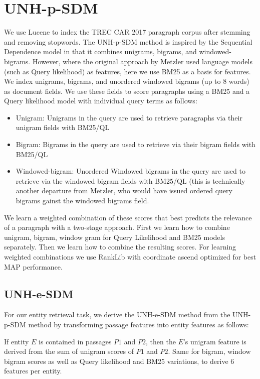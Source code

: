 \documentclass{article}
\begin{document}
\section{UNH-p-SDM}\label{sec:sdm}

We use Lucene to index the TREC CAR 2017 paragraph corpus after stemming and removing stopwords.
The UNH-p-SDM method is inspired by the Sequential Dependence model \cite{metzler2005markov} in that it combines unigrams, bigrams, and windowed-bigrams. However, where the original approach by Metzler used language models (such as Query likelihood) as features, here we use BM25 as a basis for features. 
 We index unigrams, bigrams, and unordered windowed bigrams (up to 8 words) as document fields. We use these fields to score paragraphs using a BM25 and a Query likelihood model with individual query terms as follows:
 
 \begin{itemize}
     \item Unigram: Unigrams in the query are used to retrieve paragraphs via their unigram fields with BM25/QL
     \item Bigram: Bigrams in the query are used to retrieve via their bigram fields with BM25/QL
     \item Windowed-bigram: Unordered Windowed bigrams in the query are used to retrieve via the windowed bigram fields with BM25/QL (this is technically another departure from Metzler, who would have issued ordered query bigrams gainst the windowed bigrams field.
 \end{itemize}
 

We learn a weighted combination of these scores that best predicts the relevance of a paragraph with a two-stage approach. First we learn how to combine unigram, bigram, window gram for Query Likelihood and BM25 models separately. Then we learn how to combine the resulting scores. For learning weighted combinations we use RankLib with coordinate ascend optimized for best MAP performance.


\subsection{UNH-e-SDM}

For our entity retrieval task, we derive the UNH-e-SDM method from the UNH-p-SDM method by transforming passage features into entity features as follows:

If entity $E$ is contained in passages $P1$ and $P2$, then the $E$'s unigram feature is derived from the sum of unigram scores of $P1$ and $P2$. Same for bigram, window bigram scores as well as Query likelihood and BM25 variations, to derive 6 features per entity.
\end{document}
